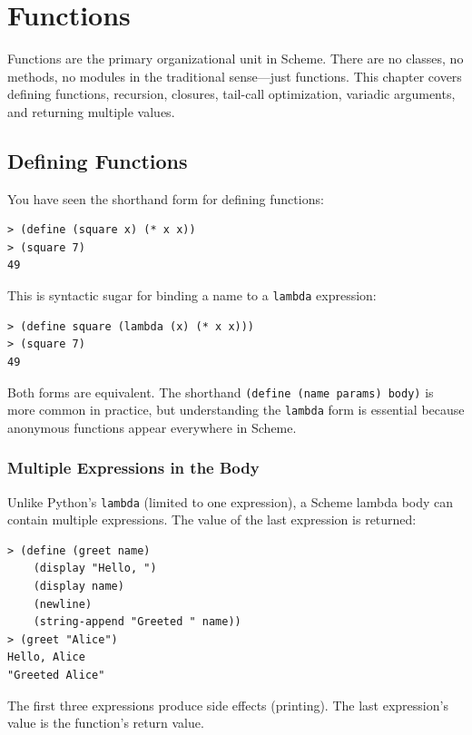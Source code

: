 \chapter{Functions}
\label{ch:functions}

Functions are the primary organizational unit in Scheme. There are no classes, no methods, no modules in the traditional sense---just functions. This chapter covers defining functions, recursion, closures, tail-call optimization, variadic arguments, and returning multiple values.

\section{Defining Functions}

You have seen the shorthand form for defining functions:

\begin{lstlisting}[style=repl]
> (define (square x) (* x x))
> (square 7)
49
\end{lstlisting}

This is syntactic sugar for binding a name to a \texttt{lambda} expression:

\begin{lstlisting}[style=repl]
> (define square (lambda (x) (* x x)))
> (square 7)
49
\end{lstlisting}

Both forms are equivalent. The shorthand \texttt{(define (name params) body)} is more common in practice, but understanding the \texttt{lambda} form is essential because anonymous functions appear everywhere in Scheme.

\subsection{Multiple Expressions in the Body}

Unlike Python's \texttt{lambda} (limited to one expression), a Scheme lambda body can contain multiple expressions. The value of the last expression is returned:

\begin{lstlisting}[style=repl]
> (define (greet name)
    (display "Hello, ")
    (display name)
    (newline)
    (string-append "Greeted " name))
> (greet "Alice")
Hello, Alice
"Greeted Alice"
\end{lstlisting}

The first three expressions produce side effects (printing). The last expression's value is the function's return value.


